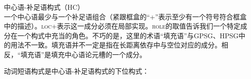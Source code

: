 \ea
中心语-补足语构式（HC）\\
\setlength{\fboxsep}{2mm}
\z
一个中心语最少与一个补足语组合（紧跟框盒的“+”表示至少有一个符号符合框盒中的描述）。\textsc{loc}+表示这一成分必须在局部实现。\textsc{role}的取值告诉我们一个特定成分在一个构式中充当的角色。不巧的是，这里的术语“填充语”与GPSG、HPSG中的用法不一致。填充语并不一定是指在长距离依存中与空位对应的成分。相反，“填充语”是填充中心语论元槽的一个成分。

动词短语构式是中心语-补足语构式的下位构式：
 
